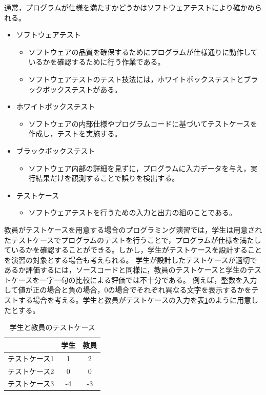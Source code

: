 \documentclass{tpu-sotu}
\begin{document}
通常，プログラムが仕様を満たすかどうかはソフトウェアテストにより確かめられる。
\begin{itemize}
\item ソフトウェアテスト
\begin{itemize}
\item ソフトウェアの品質を確保するためにプログラムが仕様通りに動作しているかを確認するために行う作業である。
\item ソフトウェアテストのテスト技法には，ホワイトボックステストとブラックボックステストがある。
\end{itemize}
\end{itemize}
\begin{itemize}
\item ホワイトボックステスト
\begin{itemize}
\item ソフトウェアの内部仕様やプログラムコードに基づいてテストケースを作成し，テストを実施する。
\end{itemize}
\end{itemize}
\begin{itemize}
\item ブラックボックステスト
\begin{itemize}
\item ソフトウェア内部の詳細を見ずに，プログラムに入力データを与え，実行結果だけを観測することで誤りを検出する。
\end{itemize}
\end{itemize}
\begin{itemize}
\item テストケース
\begin{itemize}
\item ソフトウェアテストを行うための入力と出力の組のことである。
\end{itemize}
\end{itemize}
教員がテストケースを用意する場合のプログラミング演習では，学生は用意されたテストケースでプログラムのテストを行うことで，プログラムが仕様を満たしているかを確認することができる。しかし，学生がテストケースを設計することを演習の対象とする場合も考えられる。
学生が設計したテストケースが適切であるか評価するには，ソースコードと同様に，教員のテストケースと学生のテストケースを一字一句の比較による評価では不十分である。
例えば，整数を入力して値が正の場合と負の場合，0の場合でそれぞれ異なる文字を表示するかをテストする場合を考える。学生と教員がテストケースの入力を表\ref{testcase}のように用意したとする。
\begin{table}[htb]
\centering
\caption{学生と教員のテストケース}
  \begin{tabular}{|c|c|c|} \hline
     & 学生 & 教員  \\ \hline
    テストケース1 & 1 & 2  \\ \hline
    テストケース2 & 0 & 0 \\ \hline
    テストケース3 & -4 & -3 \\ \hline
  \end{tabular}
  \label{testcase}
\end{table}
\end{document}
